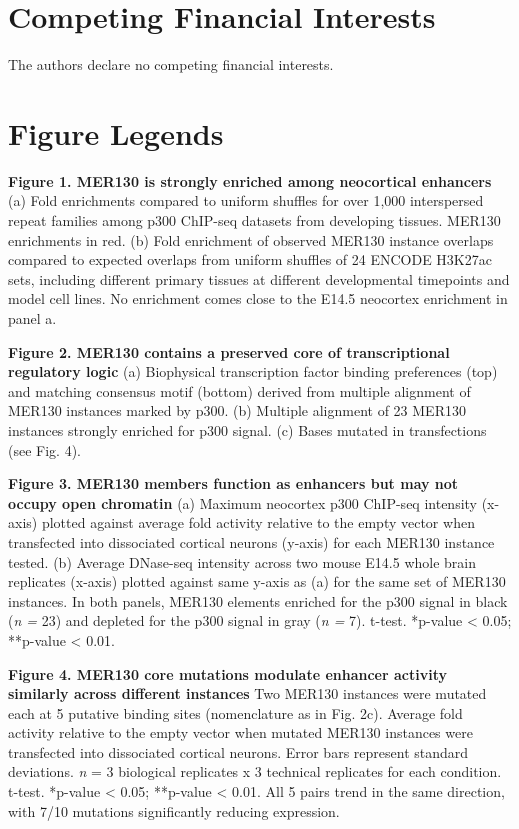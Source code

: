 \documentclass[]{article}
\begin{document}
\section{Competing Financial
Interests}\label{competing-financial-interests}

The authors declare no competing financial interests.

\section{Figure Legends}\label{figure-legends}

\textbf{Figure 1. MER130 is strongly enriched among neocortical
enhancers} (a) Fold enrichments compared to uniform shuffles for over
1,000 interspersed repeat families among p300 ChIP-seq datasets from
developing tissues. MER130 enrichments in red. (b) Fold enrichment of
observed MER130 instance overlaps compared to expected overlaps from
uniform shuffles of 24 ENCODE H3K27ac sets, including different primary
tissues at different developmental timepoints and model cell lines. No
enrichment comes close to the E14.5 neocortex enrichment in panel a.

\textbf{Figure 2. MER130 contains a preserved core of transcriptional
regulatory logic} (a) Biophysical transcription factor binding
preferences (top) and matching consensus motif (bottom) derived from
multiple alignment of MER130 instances marked by p300. (b) Multiple
alignment of 23 MER130 instances strongly enriched for p300 signal. (c)
Bases mutated in transfections (see Fig. 4).

\textbf{Figure 3. MER130 members function as enhancers but may not
occupy open chromatin} (a) Maximum neocortex p300 ChIP-seq intensity
(x-axis) plotted against average fold activity relative to the empty
vector when transfected into dissociated cortical neurons (y-axis) for
each MER130 instance tested. (b) Average DNase-seq intensity across two
mouse E14.5 whole brain replicates (x-axis) plotted against same y-axis
as (a) for the same set of MER130 instances. In both panels, MER130
elements enriched for the p300 signal in black (\emph{n =} 23) and
depleted for the p300 signal in gray (\emph{n =} 7). t-test. *p-value
\textless{} 0.05; **p-value \textless{} 0.01.

\textbf{Figure 4. MER130 core mutations modulate enhancer activity
similarly across different instances} Two MER130 instances were mutated
each at 5 putative binding sites (nomenclature as in Fig. 2c). Average
fold activity relative to the empty vector when mutated MER130 instances
were transfected into dissociated cortical neurons. Error bars represent
standard deviations. \emph{n} = 3 biological replicates x 3 technical
replicates for each condition. t-test. *p-value \textless{} 0.05;
**p-value \textless{} 0.01. All 5 pairs trend in the same direction,
with 7/10 mutations significantly reducing expression.
\end{document}

